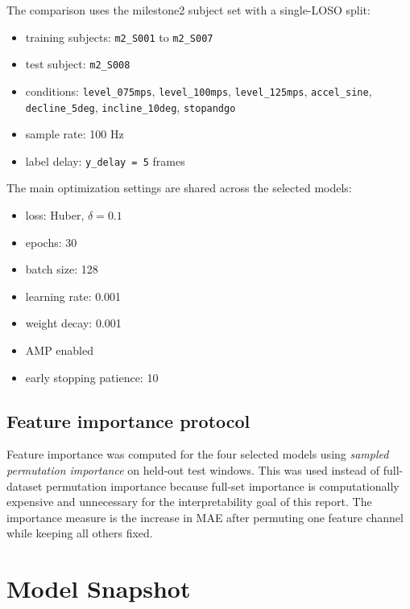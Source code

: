 \documentclass[11pt,a4paper]{article}
\begin{document}
The comparison uses the milestone2 subject set with a single-LOSO split:
\begin{itemize}
\item training subjects: \texttt{m2\_S001} to \texttt{m2\_S007}
\item test subject: \texttt{m2\_S008}
\item conditions: \texttt{level\_075mps}, \texttt{level\_100mps}, \texttt{level\_125mps}, \texttt{accel\_sine}, \texttt{decline\_5deg}, \texttt{incline\_10deg}, \texttt{stopandgo}
\item sample rate: 100 Hz
\item label delay: \texttt{y\_delay = 5} frames
\end{itemize}

The main optimization settings are shared across the selected models:
\begin{itemize}
\item loss: Huber, \(\delta=0.1\)
\item epochs: 30
\item batch size: 128
\item learning rate: 0.001
\item weight decay: 0.001
\item AMP enabled
\item early stopping patience: 10
\end{itemize}

\subsection{Feature importance protocol}

Feature importance was computed for the four selected models using \emph{sampled permutation importance} on held-out test windows.
This was used instead of full-dataset permutation importance because full-set importance is computationally expensive and unnecessary for the interpretability goal of this report.
The importance measure is the increase in MAE after permuting one feature channel while keeping all others fixed.

\section{Model Snapshot}
\end{document}
